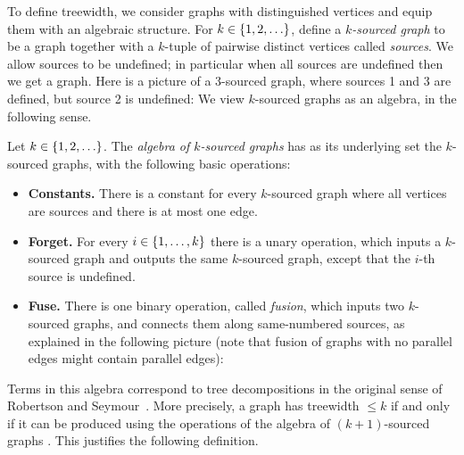         
        
 To define treewidth, we consider graphs with distinguished vertices and equip them with an algebraic structure. 
    For $k \in \{1,2,\ldots\}$,  define a \emph{$k$-sourced graph}
     to be a  graph together with a $k$-tuple of pairwise distinct vertices called \emph{sources}. We allow sources to be undefined; in particular when all sources are undefined then we get a graph. Here is a 
    picture of a 3-sourced graph, where sources 1 and 3 are defined, but source 2 is undefined:
    We view  $k$-sourced graphs as an algebra, in the following sense.



    
    \begin{definition}
         Let $k \in \{1,2,\ldots\}$. The \emph{algebra of $k$-sourced graphs} has as its underlying set the  $k$-sourced graphs,  with the following basic operations:
            \begin{itemize}
                \item {\bf Constants.} There is a constant for every $k$-sourced graph where all vertices are sources and there is at most one edge.
                \item {\bf Forget.} For every $i \in \{1,\ldots,k\}$ there is a unary operation, which inputs a $k$-sourced graph and outputs the same $k$-sourced graph, except that the $i$-th source is undefined. 
                \item {\bf Fuse.} There is one binary operation, called \emph{fusion}, which inputs two $k$-sourced graphs, and 
                connects %
                them along same-numbered sources, 
                as explained in the following picture (note that fusion of graphs with no parallel edges might contain parallel edges):
            \end{itemize}
        \end{definition}
    
        Terms in this algebra correspond to tree decompositions in the original sense of Robertson and Seymour~\cite[Section 12.3]{diestel}. More precisely, a graph has treewidth $\leq k$  if and only if it can be produced using the operations of the algebra of $(k+1)$-sourced graphs \cite[Proposition 4.1]{courcelleEtAlAlgebraicTheoryOfGraphReduction93}. This justifies the following definition.


